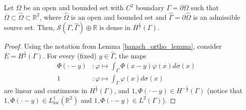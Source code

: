 \begin{theorem}\label{MFS_lap_dense}
    Let \(\Omega\) be an open and bounded set with \(C^2\) boundary \(\Gamma = \partial \Omega\) such that \(\overline{\Omega} \subset \hat{\Omega} \subset \mathbb{R}^2\), where \(\hat{\Omega}\) is an open and bounded set and \(\hat{\Gamma} = \partial \hat{\Omega}\) is an admissible source set. Then, \(\mathcal{S}(\Gamma, \hat{\Gamma}) \oplus \mathbb{R}\) is dense in \(H^\frac{1}{2}(\Gamma)\).
\end{theorem}
\begin{proof}
    Using the notation from Lemma \ref{banach_ortho_lemma}, consider $E=H^\frac{1}{2}(\Gamma)$. For every (fixed) \(y \in \hat{\Gamma}\), the maps
    \begin{align*}
        \Phi(\cdot-y)&: \varphi \mapsto \int_\Gamma \Phi(x-y)\varphi(x) d\sigma(x)\\
        1&: \varphi \mapsto \int_\Gamma \varphi (x) d\sigma(x)
    \end{align*}
    are linear and continuous in \(H^\frac{1}{2}(\Gamma)\), and \(1, \Phi(\cdot-y) \in H^{-\frac{1}{2}}(\Gamma)\) (notice that \(1, \Phi(\cdot-y) \in L^1_{\text{loc}}(\mathbb{R}^2)\) and \(1, \Phi(\cdot-y) \in L^2({\Gamma})\)).
    

\end{proof}
